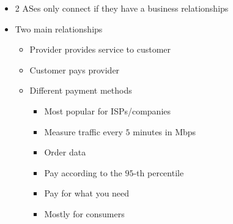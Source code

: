 \begin{itemize}
\begin{itemize}
\begin{itemize}
                        \begin{itemize}
                            \item 2 ASes only connect if they have a business relationships
                            \item Two main relationships
                                \begin{itemize}
                                    \item Provider provides service to customer
                                    \item Customer pays provider
                                    \item Different payment methods
                                        \begin{itemize}
                                                \begin{itemize}
                                                    \item Most popular for ISPs/companies
                                                    \item Measure traffic every $5$ minutes in Mbps
                                                    \item Order data
                                                    \item Pay according to the $95$-th percentile
                                                \end{itemize}
                                                \begin{itemize}
                                                    \item Pay for what you need
                                                \end{itemize}
                                                \begin{itemize}
                                                    \item Mostly for consumers
                                                \end{itemize}
                                        \end{itemize}
                                \end{itemize}

\end{itemize}
\end{itemize}
\end{itemize}
\end{itemize}

